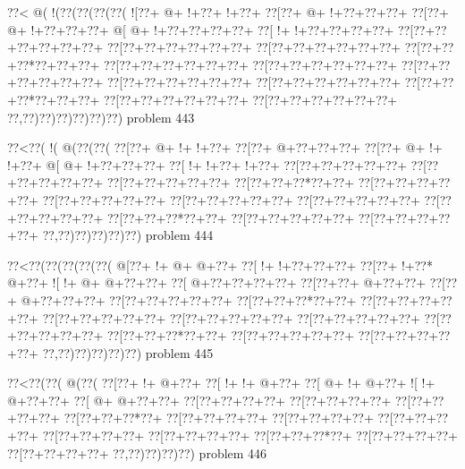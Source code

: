\vbox{\vbox{\goo
\0??<\- @(\- !(\0??(\0??(\0??(\0??(
\- ![\0??+\- @+\- !+\0??+\- !+\0??+
\0??[\0??+\- @+\- !+\0??+\0??+\0??+
\0??[\0??+\- @+\- !+\0??+\0??+\0??+
\- @[\- @+\- !+\0??+\0??+\0??+\0??+
\0??[\- !+\- !+\0??+\0??+\0??+\0??+
\0??[\0??+\0??+\0??+\0??+\0??+\0??+
\0??[\0??+\0??+\0??+\0??+\0??+\0??+
\0??[\0??+\0??+\0??+\0??+\0??+\0??+
\0??[\0??+\0??+\0??*\0??+\0??+\0??+
\0??[\0??+\0??+\0??+\0??+\0??+\0??+
\0??[\0??+\0??+\0??+\0??+\0??+\0??+
\0??[\0??+\0??+\0??+\0??+\0??+\0??+
\0??[\0??+\0??+\0??+\0??+\0??+\0??+
\0??[\0??+\0??+\0??+\0??+\0??+\0??+
\0??[\0??+\0??+\0??*\0??+\0??+\0??+
\0??[\0??+\0??+\0??+\0??+\0??+\0??+
\0??[\0??+\0??+\0??+\0??+\0??+\0??+
\0??,\0??)\0??)\0??)\0??)\0??)\0??)
}
\hfil problem 443\hfil\break
}

\vbox{\vbox{\goo
\0??<\0??(\- !(\- @(\0??(\0??(
\0??[\0??+\- @+\- !+\- !+\0??+
\0??[\0??+\- @+\0??+\0??+\0??+
\0??[\0??+\- @+\- !+\- !+\0??+
\- @[\- @+\- !+\0??+\0??+\0??+
\0??[\- !+\- !+\0??+\- !+\0??+
\0??[\0??+\0??+\0??+\0??+\0??+
\0??[\0??+\0??+\0??+\0??+\0??+
\0??[\0??+\0??+\0??+\0??+\0??+
\0??[\0??+\0??+\0??*\0??+\0??+
\0??[\0??+\0??+\0??+\0??+\0??+
\0??[\0??+\0??+\0??+\0??+\0??+
\0??[\0??+\0??+\0??+\0??+\0??+
\0??[\0??+\0??+\0??+\0??+\0??+
\0??[\0??+\0??+\0??+\0??+\0??+
\0??[\0??+\0??+\0??*\0??+\0??+
\0??[\0??+\0??+\0??+\0??+\0??+
\0??[\0??+\0??+\0??+\0??+\0??+
\0??,\0??)\0??)\0??)\0??)\0??)
}
\hfil problem 444\hfil\break
}

\vbox{\vbox{\goo
\0??<\0??(\0??(\0??(\0??(\0??(
\- @[\0??+\- !+\- @+\- @+\0??+
\0??[\- !+\- !+\0??+\0??+\0??+
\0??[\0??+\- !+\0??*\- @+\0??+
\- ![\- !+\- @+\- @+\0??+\0??+
\0??[\- @+\0??+\0??+\0??+\0??+
\0??[\0??+\0??+\- @+\0??+\0??+
\0??[\0??+\- @+\0??+\0??+\0??+
\0??[\0??+\0??+\0??+\0??+\0??+
\0??[\0??+\0??+\0??*\0??+\0??+
\0??[\0??+\0??+\0??+\0??+\0??+
\0??[\0??+\0??+\0??+\0??+\0??+
\0??[\0??+\0??+\0??+\0??+\0??+
\0??[\0??+\0??+\0??+\0??+\0??+
\0??[\0??+\0??+\0??+\0??+\0??+
\0??[\0??+\0??+\0??*\0??+\0??+
\0??[\0??+\0??+\0??+\0??+\0??+
\0??[\0??+\0??+\0??+\0??+\0??+
\0??,\0??)\0??)\0??)\0??)\0??)
}
\hfil problem 445\hfil\break
}

\vbox{\vbox{\goo
\0??<\0??(\0??(\- @(\0??(
\0??[\0??+\- !+\- @+\0??+
\0??[\- !+\- !+\- @+\0??+
\0??[\- @+\- !+\- @+\0??+
\- ![\- !+\- @+\0??+\0??+
\0??[\- @+\- @+\0??+\0??+
\0??[\0??+\0??+\0??+\0??+
\0??[\0??+\0??+\0??+\0??+
\0??[\0??+\0??+\0??+\0??+
\0??[\0??+\0??+\0??*\0??+
\0??[\0??+\0??+\0??+\0??+
\0??[\0??+\0??+\0??+\0??+
\0??[\0??+\0??+\0??+\0??+
\0??[\0??+\0??+\0??+\0??+
\0??[\0??+\0??+\0??+\0??+
\0??[\0??+\0??+\0??*\0??+
\0??[\0??+\0??+\0??+\0??+
\0??[\0??+\0??+\0??+\0??+
\0??,\0??)\0??)\0??)\0??)
}
\hfil problem 446\hfil\break
}

